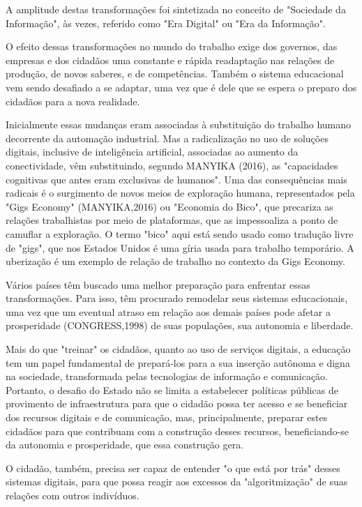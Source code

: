 A amplitude destas transformações foi sintetizada no conceito de "Sociedade da Informação", às vezes, referido como "Era Digital" ou "Era da Informação".

O efeito dessas transformações no mundo do trabalho exige dos governos, das empresas e dos cidadãos uma constante e rápida readaptação  nas relações de produção, de novos saberes, e de  competências. Também o sistema educacional vem sendo desafiado a se adaptar, uma vez que é dele que se espera o preparo dos cidadãos para a nova realidade.

Inicialmente essas mudanças eram associadas à substituição do trabalho humano decorrente da automação industrial. Mas a radicalização no uso de soluções digitais, inclusive de inteligência artificial, associadas ao aumento da conectividade, vêm substituindo, segundo MANYIKA (2016), as "capacidades cognitivas que antes eram exclusivas de humanos". Uma das consequências mais radicais é o surgimento de novos meios de exploração humana, representados pela "Gigs Economy" (MANYIKA,2016) ou "Economia do Bico", que precariza as relações trabalhistas por meio de plataformas, que as impessoaliza a ponto de camuflar a exploração. O termo "bico" aqui está sendo usado como tradução livre de "gigs", que nos Estados Unidos é uma gíria usada para trabalho temporário. A uberização é um exemplo de relação de trabalho no contexto da Gigs Economy.

Vários países têm buscado uma melhor preparação para enfrentar essas transformações. Para isso, têm procurado remodelar seus sistemas educacionais, uma vez que um eventual atraso em relação aos demais países pode afetar a prosperidade (CONGRESS,1998) de suas populações, sua autonomia e liberdade.

Mais do que "treinar" os cidadãos, quanto ao uso  de serviços digitais, a educação tem um papel fundamental de prepará-los para a sua inserção autônoma e digna na sociedade, transformada pelas tecnologias de informação e comunicação. Portanto, o desafio do Estado não se limita a estabelecer políticas públicas de provimento de infraestrutura para que o cidadão possa ter acesso e se beneficiar dos recursos digitais e de comunicação, mas, principalmente, preparar estes cidadãos para que contribuam com a construção desses recursos, beneficiando-se da autonomia e prosperidade, que  essa construção gera.

O cidadão, também, precisa ser capaz de entender "o que está por trás" desses sistemas digitais, para que possa reagir aos excessos da "algoritmização" de suas relações com outros indivíduos.


